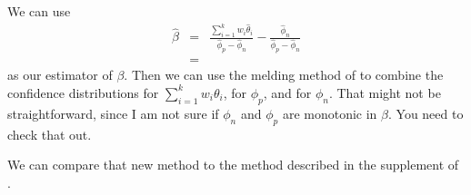 \documentclass{article}
\begin{document}
We can use
\begin{eqnarray*}
\hat{\beta} & = &   \frac{ \sum_{i=1}^{k} w_i  \hat{\theta}_i  }{ \hat{\phi}_p - \hat{\phi}_n} - \frac{ \hat{\phi}_n   }{ \hat{\phi}_p - \hat{\phi}_n} \\
& = &
\end{eqnarray*}
as our estimator of $\beta$. Then we can use the melding method of \citet{FayP:2015} to combine the confidence distributions for $\sum_{i=1}^{k} w_i  {\theta}_i$, for $\phi_p$,
and for $\phi_n$. That might not be straightforward, since I am not sure if $\phi_n$ and $\phi_p$ are monotonic in $\beta$. You need to check that out.


We can compare that new method to the method described in the supplement of \citet{Kali:2021}.




%




\end{document}
